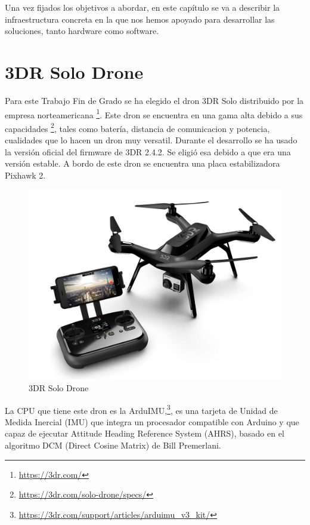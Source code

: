 Una vez fijados los objetivos a abordar, en este capítulo se va a
describir la infraestructura concreta en la que nos hemos apoyado
para desarrollar las soluciones, tanto hardware como software.

\section{3DR Solo Drone}
Para este Trabajo Fin de Grado se ha elegido el dron 3DR\cite{3dr} Solo distribuido por la empresa norteamericana \footnote{\url{https://3dr.com/}}. Este dron se encuentra en una gama alta debido a sus capacidades \footnote{\url{https://3dr.com/solo-drone/specs/}}, tales como batería, distancia de comunicacion y potencia, cualidades que lo hacen un dron muy versatil. Durante el desarrollo se ha usado la versión oficial del firmware de 3DR 2.4.2. Se eligió esa debido a que era una versión estable. A bordo de este dron se encuentra una placa estabilizadora Pixhawk 2.

\begin{figure}[H]
  \centering
  \includegraphics[scale=1]{imagenes/3drSoloDron.jpg}
  \caption{3DR Solo Drone}
  \label{fig:3drsolodrone}
\end{figure}

La CPU que tiene este dron es la ArduIMU,\footnote{\url{https://3dr.com/support/articles/arduimu_v3_kit/}}, es una tarjeta de Unidad de Medida Inercial (IMU) que integra un procesador compatible con Arduino y que capaz de ejecutar Attitude Heading Reference System (AHRS), basado en el algoritmo DCM (Direct Cosine Matrix) de Bill Premerlani.

